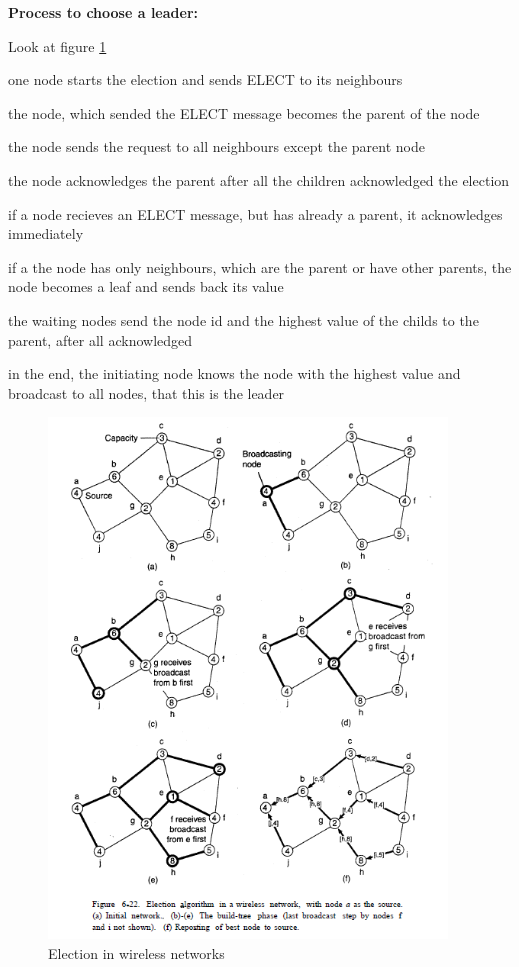\textbf{Process to choose a leader:}

Look at figure \ref{img:Leader_adhoc}

\begin{compactenum}
\item one node starts the election and sends ELECT to its neighbours
\item the node, which sended the ELECT message becomes the parent of the node
\item the node sends the request to all neighbours except the parent node
\item the node acknowledges the parent after all the children acknowledged the election
\item if a node recieves an ELECT message, but has already a parent, it acknowledges immediately
\item if a the node has only neighbours, which are the parent or have other parents, the node becomes a leaf and sends back its value
\item the waiting nodes send the node id and the highest value of the childs to the parent, after all acknowledged
\item in the end, the initiating node knows the node with the highest value and broadcast to all nodes, that this is the leader
\end{compactenum}
\begin{figure}[h]
	\centering
	\includegraphics[width=400px]{gfx/Leader_adhoc.png}
	\caption{Election in wireless networks}
	\label{img:Leader_adhoc}
\end{figure}

